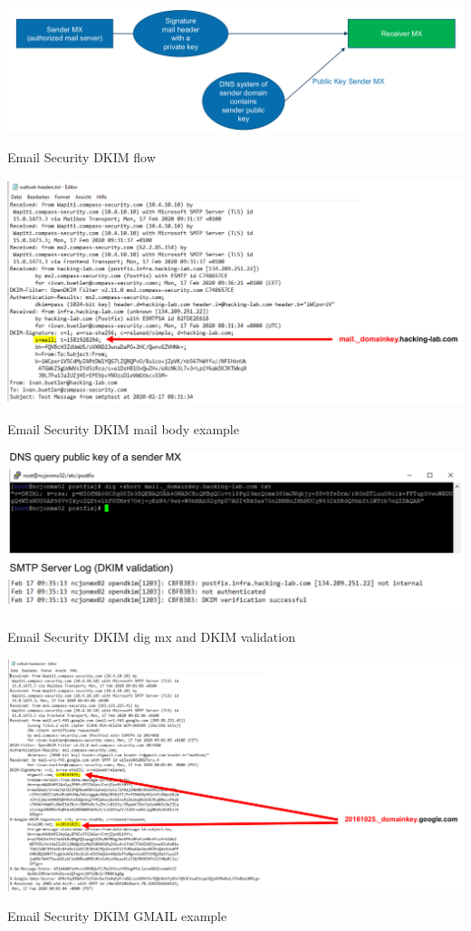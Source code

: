 \begin{table}[h]
  \centering
  \includegraphics[width=\textwidth]{resources/12-email-security-dkim.png}
  \caption{Email Security DKIM flow}
\end{table}

\begin{table}[h]
  \centering
  \includegraphics[width=\textwidth]{resources/12-email-security-dkim-2.png}
  \caption{Email Security DKIM mail body example}
\end{table}

\begin{table}[h]
  \centering
  \includegraphics[width=\textwidth]{resources/12-email-security-dkim-3.png}
  \caption{Email Security DKIM dig mx and DKIM validation}
\end{table}

\begin{table}[h]
  \centering
  \includegraphics[width=\textwidth]{resources/12-email-security-dkim-4.png}
  \caption{Email Security DKIM GMAIL example}
\end{table}


